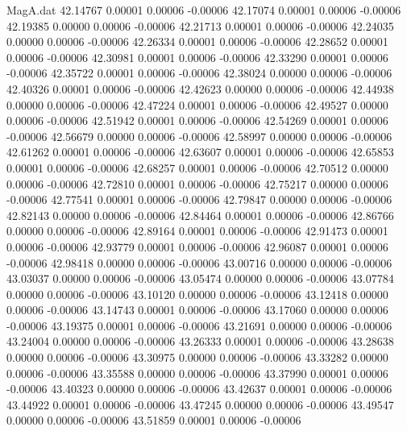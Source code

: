 \begin{filecontents}{MagA.dat}
  42.14767    0.00001    0.00006   -0.00006
  42.17074    0.00001    0.00006   -0.00006
  42.19385    0.00000    0.00006   -0.00006
  42.21713    0.00001    0.00006   -0.00006
  42.24035    0.00000    0.00006   -0.00006
  42.26334    0.00001    0.00006   -0.00006
  42.28652    0.00001    0.00006   -0.00006
  42.30981    0.00001    0.00006   -0.00006
  42.33290    0.00001    0.00006   -0.00006
  42.35722    0.00001    0.00006   -0.00006
  42.38024    0.00000    0.00006   -0.00006
  42.40326    0.00001    0.00006   -0.00006
  42.42623    0.00000    0.00006   -0.00006
  42.44938    0.00000    0.00006   -0.00006
  42.47224    0.00001    0.00006   -0.00006
  42.49527    0.00000    0.00006   -0.00006
  42.51942    0.00001    0.00006   -0.00006
  42.54269    0.00001    0.00006   -0.00006
  42.56679    0.00000    0.00006   -0.00006
  42.58997    0.00000    0.00006   -0.00006
  42.61262    0.00001    0.00006   -0.00006
  42.63607    0.00001    0.00006   -0.00006
  42.65853    0.00001    0.00006   -0.00006
  42.68257    0.00001    0.00006   -0.00006
  42.70512    0.00000    0.00006   -0.00006
  42.72810    0.00001    0.00006   -0.00006
  42.75217    0.00000    0.00006   -0.00006
  42.77541    0.00001    0.00006   -0.00006
  42.79847    0.00000    0.00006   -0.00006
  42.82143    0.00000    0.00006   -0.00006
  42.84464    0.00001    0.00006   -0.00006
  42.86766    0.00000    0.00006   -0.00006
  42.89164    0.00001    0.00006   -0.00006
  42.91473    0.00001    0.00006   -0.00006
  42.93779    0.00001    0.00006   -0.00006
  42.96087    0.00001    0.00006   -0.00006
  42.98418    0.00000    0.00006   -0.00006
  43.00716    0.00000    0.00006   -0.00006
  43.03037    0.00000    0.00006   -0.00006
  43.05474    0.00000    0.00006   -0.00006
  43.07784    0.00000    0.00006   -0.00006
  43.10120    0.00000    0.00006   -0.00006
  43.12418    0.00000    0.00006   -0.00006
  43.14743    0.00001    0.00006   -0.00006
  43.17060    0.00000    0.00006   -0.00006
  43.19375    0.00001    0.00006   -0.00006
  43.21691    0.00000    0.00006   -0.00006
  43.24004    0.00000    0.00006   -0.00006
  43.26333    0.00001    0.00006   -0.00006
  43.28638    0.00000    0.00006   -0.00006
  43.30975    0.00000    0.00006   -0.00006
  43.33282    0.00000    0.00006   -0.00006
  43.35588    0.00000    0.00006   -0.00006
  43.37990    0.00001    0.00006   -0.00006
  43.40323    0.00000    0.00006   -0.00006
  43.42637    0.00001    0.00006   -0.00006
  43.44922    0.00001    0.00006   -0.00006
  43.47245    0.00000    0.00006   -0.00006
  43.49547    0.00000    0.00006   -0.00006
  43.51859    0.00001    0.00006   -0.00006

\end{filecontents}
